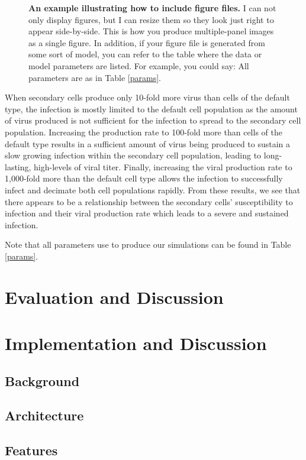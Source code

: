 \documentclass[grad,lot,lof,11pt,oneside,onehalfspace]{RUthesis}
\begin{document}
\begin{figure}
\begin{center}
\end{center}
\caption[Example figure file]{\textbf{An example illustrating how to include figure files.} I can not only display figures, but I can resize them so they look just right to appear side-by-side. This is how you produce multiple-panel images as a single figure. In addition, if your figure file is generated from some sort of model, you can refer to the table where the data or model parameters are listed. For example, you could say: All parameters are as in Table \ref{params}.}
\label{kinetics}
\end{figure}
When secondary cells produce only 10-fold more virus than cells of the default type, the infection is mostly limited to the default cell population as the amount of virus produced is not sufficient for the infection to spread to the secondary cell population. Increasing the production rate to 100-fold more than cells of the default type results in a sufficient amount of virus being produced to sustain a slow growing infection within the secondary cell population, leading to long-lasting, high-levels of viral titer. Finally, increasing the viral production rate to 1,000-fold more than the default cell type allows the infection to successfully infect and decimate both cell populations rapidly. From these results, we see that there appears to be a relationship between the secondary cells' susceptibility to infection and their viral production rate which leads to a severe and sustained infection.

Note that all parameters use to produce our simulations can be found in Table \ref{params}.


\chapter{Evaluation and Discussion}
\chapter{Implementation and Discussion}
\section{Background}
\section{Architecture}
\section{Features}
\end{document}
